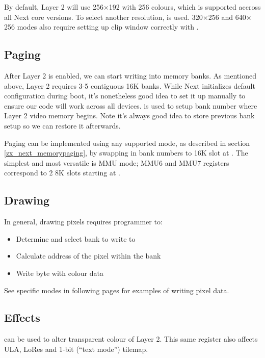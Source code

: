 By default, Layer 2 will use 256$\times$192 with 256 colours, which is supported accross all Next core versions. To select another resolution,  is used. 320$\times$256 and 640$\times$256 modes also require setting up clip window correctly with .


\subsection{Paging}

After Layer 2 is enabled, we can start writing into memory banks. As mentioned above, Layer 2 requires 3-5 contiguous 16K banks. While Next initializes default configuration during boot, it's nonetheless good idea to set it up manually to ensure our code will work across all devices.  is used to setup bank number where Layer 2 video memory begins. Note it's always good idea to store previous bank setup so we can restore it afterwards.

Paging can be implemented using any supported mode, as described in section \ref{zx_next_memorypaging}, by swapping in bank numbers to 16K slot at . The simplest and most versatile is MMU mode; MMU6 and MMU7 registers correspond to 2 8K slots starting at .

\pagebreak
\subsection{Drawing}

In general, drawing pixels requires programmer to:

\begin{itemize}[topsep=1pt,itemsep=1pt]
    \item Determine and select bank to write to
    \item Calculate address of the pixel within the bank
    \item Write byte with colour data
\end{itemize}

See specific modes in following pages for examples of writing pixel data.


\subsection{Effects}

 can be used to alter transparent colour of Layer 2. This same register also affects ULA, LoRes and 1-bit (``text mode'') tilemap.

